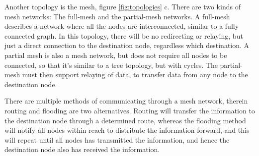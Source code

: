 Another topology is the mesh, figure \ref{fig:topologies} c. There are two kinds of mesh networks: The full-mesh and the partial-mesh networks. A full-mesh describes a network where all the nodes are interconnected, similar to a fully connected graph. In this topology, there will be no redirecting or relaying, but just a direct connection to the destination node, regardless which destination. A partial mesh is also a mesh network, but does not require all nodes to be connected, so that it's similar to a tree topology, but with cycles. The partial-mesh must then support relaying of data, to transfer data from any node to the destination node.



There are multiple methods of communicating through a mesh network, therein routing and flooding are two alternatives. Routing will transfer the information to the destination node through a determined route, whereas the flooding method will notify all nodes within reach to distribute the information forward, and this will repeat until all nodes has transmitted the information, and hence the destination node also has received the information.

